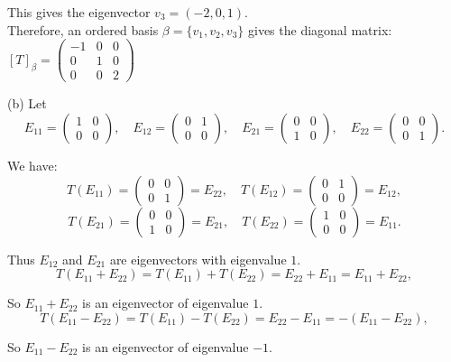 \documentclass{article}
\begin{document}
This gives the eigenvector $v_3 = (-2, 0, 1)$. \\

Therefore, an ordered basis $\beta = \{v_1, v_2, v_3\}$ gives the diagonal matrix:
$[T]_\beta = \begin{pmatrix} -1 & 0 & 0 \\ 0 & 1 & 0 \\ 0 & 0 & 2 \end{pmatrix}$

(b) Let
\[
E_{11} 
= \begin{pmatrix} 1 & 0 \\ 0 & 0 \end{pmatrix}, 
\quad
E_{12} 
= \begin{pmatrix} 0 & 1 \\ 0 & 0 \end{pmatrix},
\quad
E_{21} 
= \begin{pmatrix} 0 & 0 \\ 1 & 0 \end{pmatrix},
\quad
E_{22} 
= \begin{pmatrix} 0 & 0 \\ 0 & 1 \end{pmatrix}.
\]

We have:
\[
T(E_{11})
= \begin{pmatrix} 0 & 0 \\ 0 & 1 \end{pmatrix}
= E_{22}, 
\quad
T(E_{12})
= \begin{pmatrix} 0 & 1 \\ 0 & 0 \end{pmatrix}
= E_{12},
\]
\[
T(E_{21})
= \begin{pmatrix} 0 & 0 \\ 1 & 0 \end{pmatrix}
= E_{21},
\quad
T(E_{22})
= \begin{pmatrix} 1 & 0 \\ 0 & 0 \end{pmatrix}
= E_{11}.
\]

Thus $E_{12}$ and $E_{21}$ are eigenvectors with eigenvalue $1$.
\[
T(E_{11} + E_{22})
= T(E_{11}) + T(E_{22})
= E_{22} + E_{11}
= E_{11} + E_{22},
\]

So $E_{11} + E_{22}$ is an eigenvector of eigenvalue $1$.
\[
T(E_{11} - E_{22})
= T(E_{11}) - T(E_{22})
= E_{22} - E_{11}
= -(E_{11} - E_{22}),
\]

So $E_{11} - E_{22}$ is an eigenvector of eigenvalue $-1$. \\
\end{document}
